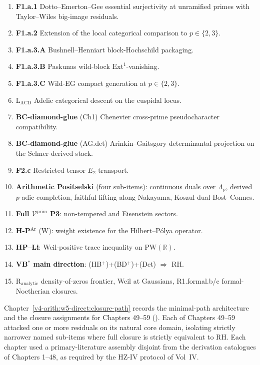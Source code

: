 \begin{enumerate}
\item \textbf{F1.a.1} Dotto--Emerton--Gee essential surjectivity at
unramified primes with Taylor--Wiles big-image residuals.
\item \textbf{F1.a.2} Extension of the local categorical comparison
to \(p\in\{2,3\}\).
\item \textbf{F1.a.3.A} Bushnell--Henniart block-Hochschild
packaging.
\item \textbf{F1.a.3.B} Paskunas wild-block
\(\mathrm{Ext}^{1}\)-vanishing.
\item \textbf{F1.a.3.C} Wild-EG compact generation at \(p\in\{2,3\}\).
\item \textbf{\(\mathrm{L}_{\mathrm{ACD}}\)} Adelic categorical descent
on the cuspidal locus.
\item \textbf{BC-diamond-glue} (Ch1) Chenevier cross-prime
pseudocharacter compatibility.
\item \textbf{BC-diamond-glue} (AG.det) Arinkin--Gaitsgory
determinantal projection on the Selmer-derived stack.
\item \textbf{F2.c} Restricted-tensor \(E_{2}\) transport.
\item \textbf{Arithmetic Positselski} (four sub-items): continuous
duals over \(\Lambda_{p}\), derived \(p\)-adic completion, faithful
lifting along Nakayama, Koszul-dual Bost--Connes.
\item \textbf{Full \(\mathcal{V}^{\mathrm{prim}}\) P3}:
non-tempered and Eisenstein sectors.
\item \textbf{H-P\(^{\mathrm{Ar}}\)} (W): weight existence for the
Hilbert--P\'olya operator.
\item \textbf{HP--Li}: Weil-positive trace inequality on
\(\mathrm{PW}(\mathbb{R})\).
\item \textbf{VB\(^{*}\) main direction}: (HB\(^{+}\))+(BD\(^{+}\))+(Det)
\(\Rightarrow\) RH.
\item \textbf{\(\mathrm{R}_{\mathrm{analytic}}\)} density-of-zeros
frontier, Weil at Gaussians, R1.formal.b/c formal-Noetherian
closures.
\end{enumerate}

Chapter~\ref{v4-arith:w5-direct:closure-path} records the
minimal-path architecture and the closure assignments for
Chapters 49--59 ().
Each of Chapters 49--59 attacked one or more residuals on its natural
core domain, isolating strictly narrower named sub-items where
full closure is strictly equivalent to RH. Each chapter used a
primary-literature assembly disjoint from the derivation catalogues
of Chapters 1--48, as required by the HZ-IV protocol of Vol~IV.

